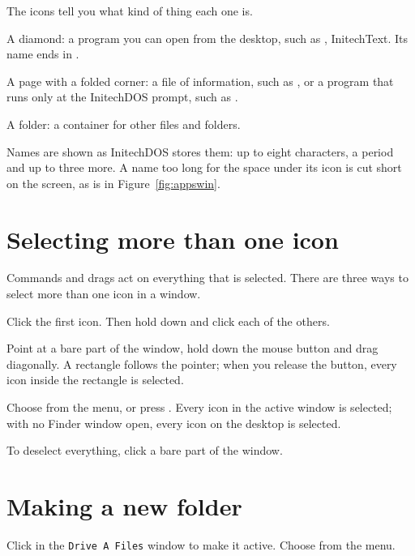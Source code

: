 The icons tell you what kind of thing each one is.

A diamond: a program you can open from the
desktop, such as , InitechText.  Its name ends in
.

A page with a folded corner: a file of information,
such as , or a program that runs only at the InitechDOS
prompt, such as .

A folder: a container for other files and folders.

Names are shown as InitechDOS stores them: up to eight characters, a
period and up to three more.  A name too long for the space under its icon
is cut short on the screen, as  is in
Figure~\ref{fig:appswin}.

\section{Selecting more than one icon}
Commands and drags act on everything that is selected.  There are three
ways to select more than one icon in a window.

Click the first icon.  Then hold down 
and click each of the others.


Point at a bare part of the window, hold
down the mouse button and drag diagonally.  A rectangle follows the
pointer; when you release the button, every icon inside the rectangle is
selected.


Choose  from the
 menu, or press .  Every icon in the active
window is selected; with no Finder window open, every icon on the desktop
is selected.


To deselect everything, click a bare part of the window.

\section{Making a new folder}
\begin{TaskSteps}
\Step Click in the \texttt{Drive A Files} window to make it active.
\Step Choose  from the  menu.
\end{TaskSteps}

